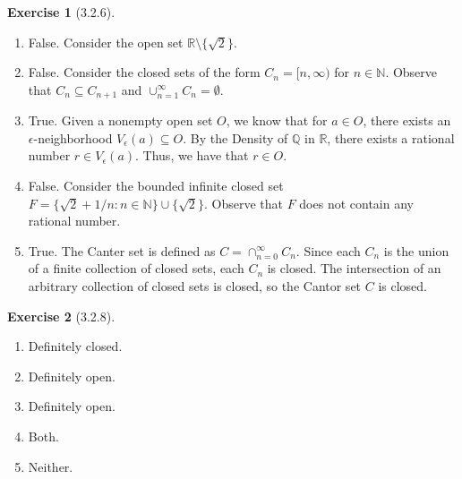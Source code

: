 \documentclass{amsart}
\theoremstyle{definition}
\newtheorem{exercise}{Exercise}
\newcommand{\N}{\mathbb{N}}
\newcommand{\Q}{\mathbb{Q}}
\newcommand{\R}{\mathbb{R}}
\newcommand{\st}{\mathrel{:}}
\begin{document}
\begin{exercise}[3.2.6]
  \begin{enumerate}[label={(\alph*)}]
    \item False. Consider the open set $\R \setminus \{\sqrt{2}\}$.
    \item False. Consider the closed sets of the form $C_n = \lbrack n, \infty
      \rparen$ for $n \in \N$. Observe that $C_n \subseteq C_{n+1}$ and
      $\cup_{n=1}^\infty C_n = \emptyset$.
    \item True. Given a nonempty open set $O$, we know that for $a \in O$, there
      exists an $\epsilon$-neighborhood $V_\epsilon(a) \subseteq O$. By the
      Density of $\Q$ in $\R$, there exists a rational number $r \in
      V_\epsilon(a)$. Thus, we have that $r \in O$.
    \item False. Consider the bounded infinite closed set $F = \{\sqrt{2} + 1/n
      \st n \in \N\} \cup \{\sqrt{2}\}$. Observe that $F$ does not contain any
      rational number.
    \item True. The Canter set is defined as $C = \cap_{n=0}^\infty C_n$. Since
      each $C_n$ is the union of a finite collection of closed sets, each $C_n$
      is closed. The intersection of an arbitrary collection of closed sets is
      closed, so the Cantor set $C$ is closed.
  \end{enumerate}
\end{exercise}

\begin{exercise}[3.2.8]
  \begin{enumerate}[label={(\alph*)}]
    \item Definitely closed.
    \item Definitely open. %
    \item Definitely open.
    \item Both. %
    \item Neither.
  \end{enumerate}
\end{exercise}
\end{document}
